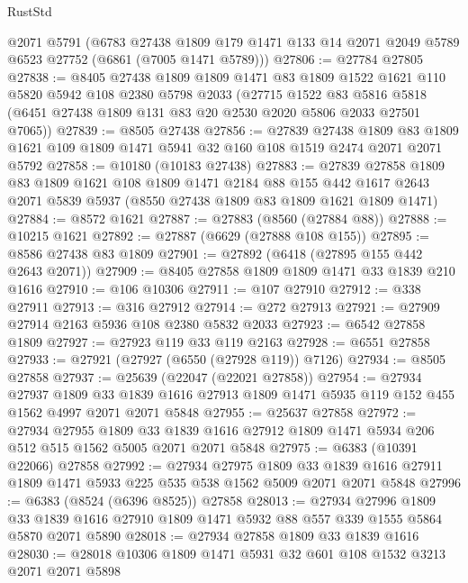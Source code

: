 \begin{lexlean}{RustStd}
\begin{coremodule}
    @2071
    @5791
    (@6783
      @27438
      @1809
      @179
      @1471
      @133
      @14
      @2071
      @2049
      @5789
      @6523
      @27752
      (@6861 (@7005 @1471 @5789)))
@27806 := @27784 @27805
@27838 := @8405
    @27438
    @1809
    @1809
    @1471
    @83
    @1809
    @1522
    @1621
    @110
    @5820
    @5942
    @108
    @2380
    @5798
    @2033
    (@27715
      @1522
      @83
      @5816
      @5818
      (@6451 @27438 @1809 @131 @83 @20 @2530 @2020 @5806 @2033 @27501 @7065))
@27839 := @8505 @27438
@27856 := @27839
    @27438
    @1809
    @83
    @1809
    @1621
    @109
    @1809
    @1471
    @5941
    @32
    @160
    @108
    @1519
    @2474
    @2071
    @2071
    @5792
@27858 := @10180 (@10183 @27438)
@27883 := @27839
    @27858
    @1809
    @83
    @1809
    @1621
    @108
    @1809
    @1471
    @2184
    @88
    @155
    @442
    @1617
    @2643
    @2071
    @5839
    @5937
    (@8550 @27438 @1809 @83 @1809 @1621 @1809 @1471)
@27884 := @8572 @1621
@27887 := @27883 (@8560 (@27884 @88))
@27888 := @10215 @1621
@27892 := @27887 (@6629 (@27888 @108 @155))
@27895 := @8586 @27438 @83 @1809
@27901 := @27892 (@6418 (@27895 @155 @442 @2643 @2071))
@27909 := @8405 @27858 @1809 @1809 @1471 @33 @1839 @210 @1616
@27910 := @106 @10306
@27911 := @107 @27910
@27912 := @338 @27911
@27913 := @316 @27912
@27914 := @272 @27913
@27921 := @27909 @27914 @2163 @5936 @108 @2380 @5832 @2033
@27923 := @6542 @27858 @1809
@27927 := @27923 @119 @33 @119 @2163
@27928 := @6551 @27858
@27933 := @27921 (@27927 (@6550 (@27928 @119)) @7126)
@27934 := @8505 @27858
@27937 := @25639 (@22047 (@22021 @27858))
@27954 := @27934
    @27937
    @1809
    @33
    @1839
    @1616
    @27913
    @1809
    @1471
    @5935
    @119
    @152
    @455
    @1562
    @4997
    @2071
    @2071
    @5848
@27955 := @25637 @27858
@27972 := @27934
    @27955
    @1809
    @33
    @1839
    @1616
    @27912
    @1809
    @1471
    @5934
    @206
    @512
    @515
    @1562
    @5005
    @2071
    @2071
    @5848
@27975 := @6383 (@10391 @22066) @27858
@27992 := @27934
    @27975
    @1809
    @33
    @1839
    @1616
    @27911
    @1809
    @1471
    @5933
    @225
    @535
    @538
    @1562
    @5009
    @2071
    @2071
    @5848
@27996 := @6383 (@8524 (@6396 @8525)) @27858
@28013 := @27934
    @27996
    @1809
    @33
    @1839
    @1616
    @27910
    @1809
    @1471
    @5932
    @88
    @557
    @339
    @1555
    @5864
    @5870
    @2071
    @5890
@28018 := @27934 @27858 @1809 @33 @1839 @1616
@28030 := @28018 @10306 @1809 @1471 @5931 @32 @601 @108 @1532 @3213 @2071 @2071 @5898

\end{coremodule}
\end{lexlean}
